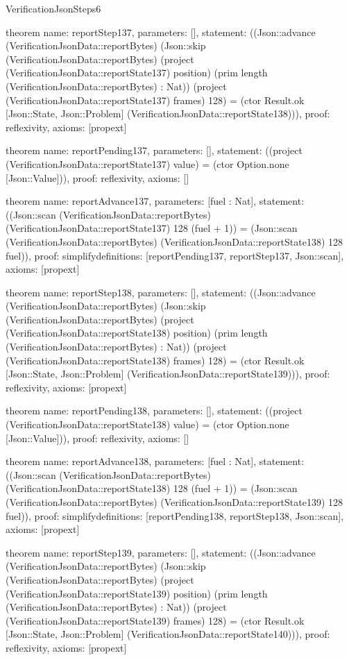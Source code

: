 \begin{lexlean}{VerificationJsonSteps6}
\begin{semanticmodule}
theorem{
  name: reportStep137,
  parameters: [],
  statement: ((Json::advance (VerificationJsonData::reportBytes) (Json::skip (VerificationJsonData::reportBytes) (project (VerificationJsonData::reportState137) position) (prim length (VerificationJsonData::reportBytes) : Nat)) (project (VerificationJsonData::reportState137) frames) 128) = (ctor Result.ok [Json::State, Json::Problem] (VerificationJsonData::reportState138))),
  proof: reflexivity{},
  axioms: [propext]
}

theorem{
  name: reportPending137,
  parameters: [],
  statement: ((project (VerificationJsonData::reportState137) value) = (ctor Option.none [Json::Value])),
  proof: reflexivity{},
  axioms: []
}

theorem{
  name: reportAdvance137,
  parameters: [fuel : Nat],
  statement: ((Json::scan (VerificationJsonData::reportBytes) (VerificationJsonData::reportState137) 128 (fuel + 1)) = (Json::scan (VerificationJsonData::reportBytes) (VerificationJsonData::reportState138) 128 fuel)),
  proof: simplify{definitions: [reportPending137, reportStep137, Json::scan]},
  axioms: [propext]
}

theorem{
  name: reportStep138,
  parameters: [],
  statement: ((Json::advance (VerificationJsonData::reportBytes) (Json::skip (VerificationJsonData::reportBytes) (project (VerificationJsonData::reportState138) position) (prim length (VerificationJsonData::reportBytes) : Nat)) (project (VerificationJsonData::reportState138) frames) 128) = (ctor Result.ok [Json::State, Json::Problem] (VerificationJsonData::reportState139))),
  proof: reflexivity{},
  axioms: [propext]
}

theorem{
  name: reportPending138,
  parameters: [],
  statement: ((project (VerificationJsonData::reportState138) value) = (ctor Option.none [Json::Value])),
  proof: reflexivity{},
  axioms: []
}

theorem{
  name: reportAdvance138,
  parameters: [fuel : Nat],
  statement: ((Json::scan (VerificationJsonData::reportBytes) (VerificationJsonData::reportState138) 128 (fuel + 1)) = (Json::scan (VerificationJsonData::reportBytes) (VerificationJsonData::reportState139) 128 fuel)),
  proof: simplify{definitions: [reportPending138, reportStep138, Json::scan]},
  axioms: [propext]
}

theorem{
  name: reportStep139,
  parameters: [],
  statement: ((Json::advance (VerificationJsonData::reportBytes) (Json::skip (VerificationJsonData::reportBytes) (project (VerificationJsonData::reportState139) position) (prim length (VerificationJsonData::reportBytes) : Nat)) (project (VerificationJsonData::reportState139) frames) 128) = (ctor Result.ok [Json::State, Json::Problem] (VerificationJsonData::reportState140))),
  proof: reflexivity{},
  axioms: [propext]
}


\end{semanticmodule}
\end{lexlean}
